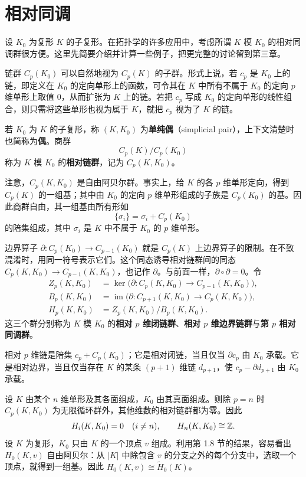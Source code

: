 \section{相对同调}
设 $K_0$ 为复形 $K$ 的子复形。在拓扑学的许多应用中，考虑所谓 $K$ 模 $K_0$ 的相对同调群很方便。这里先简要介绍并计算一些例子，把更完整的讨论留到第三章。

链群 $C_p(K_0)$ 可以自然地视为 $C_p(K)$ 的子群。形式上说，若 $c_p$ 是 $K_0$ 上的链，即定义在 $K_0$ 的定向单形上的函数，可令其在 $K$ 中所有不属于 $K_0$ 的定向 $p$ 维单形上取值 $0$，从而扩张为 $K$ 上的链。若把 $c_p$ 写成 $K_0$ 的定向单形的线性组合，则只需将这些单形也视为属于 $K$，就把 $c_p$ 视为了 $K$ 的链。

若 $K_0$ 为 $K$ 的子复形，称 $(K,K_0)$ 为\textbf{单纯偶}（simplicial pair），上下文清楚时也简称为\textbf{偶}。商群
\[
C_p(K)/C_p(K_0)
\]
称为 $K$ 模 $K_0$ 的\textbf{相对链群}，记为 $C_p(K,K_0)$。

注意，$C_p(K,K_0)$ 是自由阿贝尔群。事实上，给 $K$ 的各 $p$ 维单形定向，得到 $C_p(K)$ 的一组基；其中由 $K_0$ 的定向 $p$ 维单形组成的子族是 $C_p(K_0)$ 的基。因此商群自由，其一组基由所有形如
\[
\{\sigma_i\}=\sigma_i+C_p(K_0)
\]
的陪集组成，其中 $\sigma_i$ 是 $K$ 中不属于 $K_0$ 的 $p$ 维单形。

边界算子 $\partial:C_p(K_0)\to C_{p-1}(K_0)$ 就是 $C_p(K)$ 上边界算子的限制。在不致混淆时，用同一符号表示它们。这个同态诱导相对链群间的同态 $C_p(K,K_0)\to C_{p-1}(K,K_0)$，也记作 $\partial$。与前面一样，$\partial\circ\partial=0$。令
\[
\begin{aligned}
Z_p(K,K_0)&=\ker\bigl(\partial:C_p(K,K_0)\to C_{p-1}(K,K_0)\bigr),\\
B_p(K,K_0)&=\operatorname{im}\bigl(\partial:C_{p+1}(K,K_0)\to C_p(K,K_0)\bigr),\\
H_p(K,K_0)&=Z_p(K,K_0)/B_p(K,K_0).
\end{aligned}
\]
这三个群分别称为 $K$ 模 $K_0$ 的\textbf{相对 $p$ 维闭链群}、\textbf{相对 $p$ 维边界链群}与\textbf{第 $p$ 相对同调群}。

相对 $p$ 维链是陪集 $c_p+C_p(K_0)$；它是相对闭链，当且仅当 $\partial c_p$ 由 $K_0$ 承载。它是相对边界，当且仅当存在 $K$ 的某条 $(p+1)$ 维链 $d_{p+1}$，使 $c_p-\partial d_{p+1}$ 由 $K_0$ 承载。

设 $K$ 由某个 $n$ 维单形及其各面组成，$K_0$ 由其真面组成。则除 $p=n$ 时 $C_p(K,K_0)$ 为无限循环群外，其他维数的相对链群都为零。因此
\[
H_i(K,K_0)=0\quad(i\ne n),\qquad H_n(K,K_0)\cong\mathbb{Z}.
\]
设 $K$ 为复形，$K_0$ 只由 $K$ 的一个顶点 $v$ 组成。利用第 1.8 节的结果，容易看出 $H_0(K,v)$ 自由阿贝尔：从 $|K|$ 中除包含 $v$ 的分支之外的每个分支中，选取一个顶点，就得到一组基。因此 $H_0(K,v)\cong\widetilde H_0(K)$。

